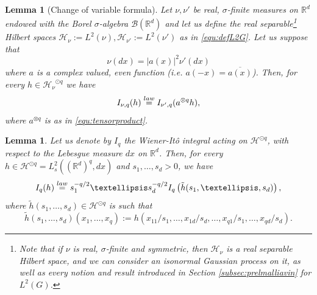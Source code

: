 \documentclass[12pt]{article}
\DeclareMathOperator{\1}{1}
\newcommand{\R}{\mathbb{R}}
\newcommand{\B}{\mathcal B}
\renewcommand{\L}{ L}
\theoremstyle{plain}
\newtheorem{lemma}[theorem]{Lemma}
\theoremstyle{definition}
\begin{document}
\begin{lemma}[Change of variable formula]\label{change}
    Let $\nu, \nu'$ be real, $\sigma$-finite measures on $\R^d$ endowed with the Borel $\sigma$-algebra $\B(\R^d)$ and let us define the real separable\footnote{Note that if $\nu$ is real, $\sigma$-finite and symmetric, then $\mathcal{H}_\nu$ is a real separable Hilbert space, and we can consider an isonormal Gaussian process on it, as well as every notion and result introduced in Section \ref{subsec:prelmalliavin} for $\L^2(G)$. } Hilbert spaces $\mathcal{H}_{\nu}:=\L^2(\nu), \mathcal{H_{\nu'}}:=\L^2(\nu')$ as in \eqref{equ:defL2G}. Let us suppose that 
    \begin{equation}
        \label{abscont}
        \nu(dx)=|a(x)|^2 \nu'(dx)
    \end{equation}
    where $a$ is a complex valued, even function (i.e. $a(-x)=\overline{a(x)}$). Then, for every $h\in \mathcal{H_{\nu}}^{\odot q}$ we have 
    \[
    I_{\nu,q}(h)\overset{\rm law}{=}I_{\nu',q}( a^{\otimes q}h),
    \]
    where $a^{\otimes q}$ is as in \eqref{equ:tensorproduct}.
\end{lemma}

 \begin{lemma}\label{change2}
     Let us denote by $I_q$ the Wiener-It\^o integral acting on $\mathcal{H}^{\odot q}$, with respect to the Lebesgue measure $dx$ on $\R^d$. Then, for every $h\in \mathcal{H}^{\odot q}=L^2_{s}((\R^{d})^q,dx)$ and $s_1,\dots,s_d>0$, we have
     \[
    I_{q}(h)\overset{\rm law}{=} s_1^{-q/2}\ldots s_d^{-q/2} I_{q}\left(\tilde h(s_1,\ldots,s_d)\right),
    \]
    where $\tilde h(s_1,\ldots,s_d)\in \mathcal H^{\odot q}$ is such that \begin{equation}
        \tilde h(s_1,\ldots,s_d) (x_1,\ldots,x_q) := h(x_{11}/s_1,\ldots, x_{1d}/s_d, \ldots, x_{q1}/s_1,\ldots, x_{qd}/s_d ).
    \end{equation}
 \end{lemma}
 
\end{document}
